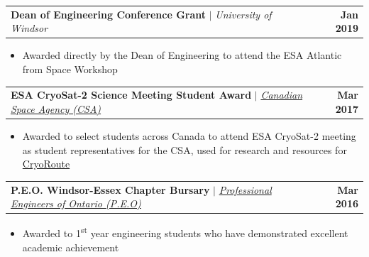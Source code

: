 \documentclass[letterpaper,11pt]{article}
\makeatletter
\newcommand{\resumeItem}[1]{
  \item\small{
    {#1 \vspace{-2pt}}
  }
}
\newcommand{\resumeProjectHeading}[2]{
    \item
    \begin{tabular*}{1.0\linewidth}{l@{\extracolsep{\fill}}r}
      \small#1 & \textbf{\small #2}\\
    \end{tabular*}\vspace{-7pt}
}
\newcommand{\resumeItemListStart}{\begin{itemize}}
\newcommand{\resumeItemListEnd}{\end{itemize}\vspace{-5pt}}
\makeatother
\begin{document}
      \resumeProjectHeading
          {\textbf{Dean of Engineering Conference Grant} $|$ \emph{University of Windsor}}{Jan 2019}
          \resumeItemListStart
            \resumeItem{Awarded directly by the Dean of Engineering to attend the ESA Atlantic from Space Workshop}
          \resumeItemListEnd
          \vspace{-4pt}
          \newpage
      \resumeProjectHeading
          {\textbf{ESA CryoSat-2 Science Meeting Student Award} $|$ \emph{\href{https://www.asc-csa.gc.ca/}{Canadian Space Agency (CSA)}}}{Mar 2017}
          \resumeItemListStart
            \resumeItem{Awarded to select students across Canada to attend ESA CryoSat-2 meeting as student representatives for the CSA, used for research and resources for \href{https://www.atillasaadat.com/post/cryoroute-globally-optimized-naval-routes-in-north-arctic-ocean}{CryoRoute}}
          \resumeItemListEnd
          \vspace{-4pt}
      \resumeProjectHeading
          {\textbf{P.E.O. Windsor-Essex Chapter Bursary} $|$ \emph{\href{https://www.peo.on.ca/chapters/windsoressex}{Professional Engineers of Ontario (P.E.O)}}}{Mar 2016}
          \resumeItemListStart
            \resumeItem{Awarded to 1\textsuperscript{st} year engineering students who have demonstrated excellent academic achievement}
          \resumeItemListEnd
          \vspace{-4pt}
          
\end{document}

